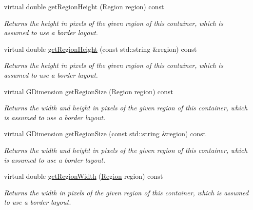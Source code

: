 \begin{DoxyCompactItemize}
virtual double \mbox{\hyperlink{classGContainer_a164d248057318961e7f2abc8c3477d63}{get\+Region\+Height}} (\mbox{\hyperlink{classGContainer_a81a01a86de31071a92e6cce0bab9bc4b}{Region}} region) const
\begin{DoxyCompactList}\small\item\em Returns the height in pixels of the given region of this container, which is assumed to use a border layout. \end{DoxyCompactList}\item 
virtual double \mbox{\hyperlink{classGContainer_ae8a545e772745b89edaf9804a2dc0057}{get\+Region\+Height}} (const std\+::string \&region) const
\begin{DoxyCompactList}\small\item\em Returns the height in pixels of the given region of this container, which is assumed to use a border layout. \end{DoxyCompactList}\item 
virtual \mbox{\hyperlink{classGDimension}{G\+Dimension}} \mbox{\hyperlink{classGContainer_a3b5db9ffbd4b32260f80634f162dba4e}{get\+Region\+Size}} (\mbox{\hyperlink{classGContainer_a81a01a86de31071a92e6cce0bab9bc4b}{Region}} region) const
\begin{DoxyCompactList}\small\item\em Returns the width and height in pixels of the given region of this container, which is assumed to use a border layout. \end{DoxyCompactList}\item 
virtual \mbox{\hyperlink{classGDimension}{G\+Dimension}} \mbox{\hyperlink{classGContainer_a68b18b38b72cb8779fca0c3882549a6b}{get\+Region\+Size}} (const std\+::string \&region) const
\begin{DoxyCompactList}\small\item\em Returns the width and height in pixels of the given region of this container, which is assumed to use a border layout. \end{DoxyCompactList}\item 
virtual double \mbox{\hyperlink{classGContainer_a96e2005c3f447a8679c3c32d3fc02de1}{get\+Region\+Width}} (\mbox{\hyperlink{classGContainer_a81a01a86de31071a92e6cce0bab9bc4b}{Region}} region) const
\begin{DoxyCompactList}\small\item\em Returns the width in pixels of the given region of this container, which is assumed to use a border layout. \end{DoxyCompactList}\item 

\end{DoxyCompactItemize}
